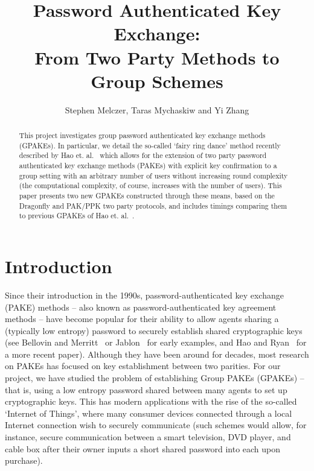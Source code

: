 \documentclass{amsart}
\author{Stephen Melczer, Taras Mychaskiw and Yi Zhang}
\title{Password Authenticated Key Exchange:\\ From Two Party Methods to Group Schemes}
\theoremstyle{remark}
\begin{document}
\begin{abstract}
This project investigates group password authenticated key exchange methods (GPAKEs).  In 
particular, we detail the so-called `fairy ring dance' method recently described by 
Hao et. al.~\cite{HaYiChSh15} which allows for the extension of two party password authenticated key exchange 
methods (PAKEs) with explicit key confirmation to a group setting with an arbitrary number of users without
increasing round complexity (the computational complexity, of course, increases with the number of users).  
This paper presents two new GPAKEs constructed through these means, based on the 
Dragonfly and PAK/PPK two party protocols, and includes timings comparing them to previous GPAKEs of
Hao et. al.~\cite{HaYiChSh15}.
\end{abstract}

\maketitle


\section{Introduction}

Since their introduction in the 1990s, password-authenticated key exchange (PAKE) methods -- 
also known as password-authenticated key agreement methods -- have become popular for their 
ability to allow agents sharing a (typically low entropy) password to securely establish shared 
cryptographic keys (see Bellovin and Merritt~\cite{BeMe92} or Jablon~\cite{Ja96} for early examples, 
and Hao and Ryan~\cite{HaRy2010} for a more recent paper).  Although they have been around for decades, 
most research on PAKEs has focused on key establishment between two parities.  For our project, we 
have studied the problem of establishing Group PAKEs (GPAKEs) -- that is, using a low entropy password 
shared between many agents to set up cryptographic keys.  This has modern applications with the rise
of the so-called `Internet of Things', where many consumer devices connected through a local Internet 
connection wish to securely communicate (such schemes would allow, for instance, secure communication 
between a smart television, DVD player, and cable box after their owner inputs a short shared password 
into each upon purchase).
\\
\end{document}
